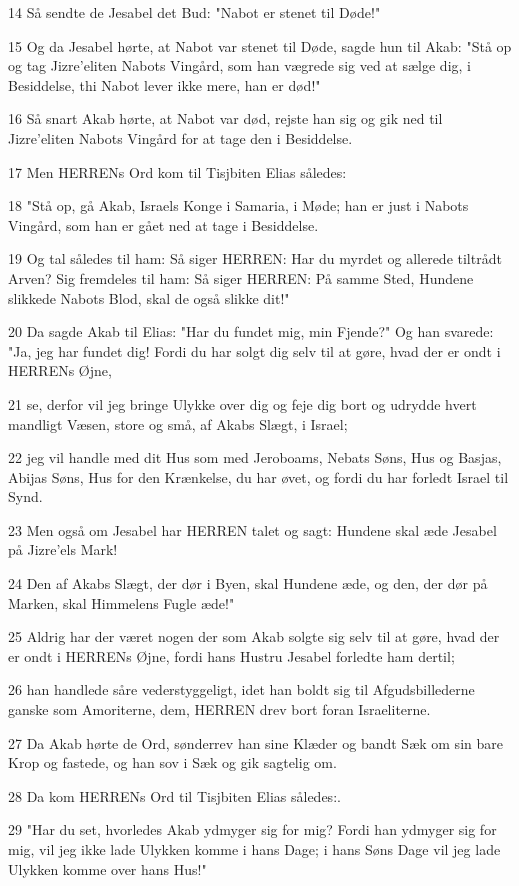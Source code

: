 \par 14 Så sendte de Jesabel det Bud: "Nabot er stenet til Døde!"
\par 15 Og da Jesabel hørte, at Nabot var stenet til Døde, sagde hun til Akab: "Stå op og tag Jizre'eliten Nabots Vingård, som han vægrede sig ved at sælge dig, i Besiddelse, thi Nabot lever ikke mere, han er død!"
\par 16 Så snart Akab hørte, at Nabot var død, rejste han sig og gik ned til Jizre'eliten Nabots Vingård for at tage den i Besiddelse.
\par 17 Men HERRENs Ord kom til Tisjbiten Elias således:
\par 18 "Stå op, gå Akab, Israels Konge i Samaria, i Møde; han er just i Nabots Vingård, som han er gået ned at tage i Besiddelse.
\par 19 Og tal således til ham: Så siger HERREN: Har du myrdet og allerede tiltrådt Arven? Sig fremdeles til ham: Så siger HERREN: På samme Sted, Hundene slikkede Nabots Blod, skal de også slikke dit!"
\par 20 Da sagde Akab til Elias: "Har du fundet mig, min Fjende?" Og han svarede: "Ja, jeg har fundet dig! Fordi du har solgt dig selv til at gøre, hvad der er ondt i HERRENs Øjne,
\par 21 se, derfor vil jeg bringe Ulykke over dig og feje dig bort og udrydde hvert mandligt Væsen, store og små, af Akabs Slægt, i Israel;
\par 22 jeg vil handle med dit Hus som med Jeroboams, Nebats Søns, Hus og Basjas, Abijas Søns, Hus for den Krænkelse, du har øvet, og fordi du har forledt Israel til Synd.
\par 23 Men også om Jesabel har HERREN talet og sagt: Hundene skal æde Jesabel på Jizre'els Mark!
\par 24 Den af Akabs Slægt, der dør i Byen, skal Hundene æde, og den, der dør på Marken, skal Himmelens Fugle æde!"
\par 25 Aldrig har der været nogen der som Akab solgte sig selv til at gøre, hvad der er ondt i HERRENs Øjne, fordi hans Hustru Jesabel forledte ham dertil;
\par 26 han handlede såre vederstyggeligt, idet han boldt sig til Afgudsbillederne ganske som Amoriterne, dem, HERREN drev bort foran Israeliterne.
\par 27 Da Akab hørte de Ord, sønderrev han sine Klæder og bandt Sæk om sin bare Krop og fastede, og han sov i Sæk og gik sagtelig om.
\par 28 Da kom HERRENs Ord til Tisjbiten Elias således:.
\par 29 "Har du set, hvorledes Akab ydmyger sig for mig? Fordi han ydmyger sig for mig, vil jeg ikke lade Ulykken komme i hans Dage; i hans Søns Dage vil jeg lade Ulykken komme over hans Hus!"

